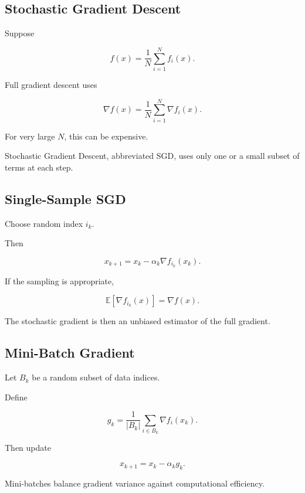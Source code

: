 \subsection{Stochastic Gradient Descent}
\label{subsec:stochastic-gradient-descent}

Suppose

\[
\boxed{
f(x)
=
\frac1N
\sum_{i=1}^{N}
f_i(x).
}
\]

Full gradient descent uses

\[
\boxed{
\nabla f(x)
=
\frac1N
\sum_{i=1}^{N}
\nabla f_i(x).
}
\]

For very large \(N\), this can be expensive.

Stochastic Gradient Descent, abbreviated SGD, uses only one or a small
subset of terms at each step.

\subsection{Single-Sample SGD}
\label{subsec:single-sample-sgd}

Choose random index \(i_k\).

Then

\[
\boxed{
x_{k+1}
=
x_k
-
\alpha_k
\nabla f_{i_k}(x_k).
}
\]

If the sampling is appropriate,

\[
\boxed{
\mathbb{E}
[
\nabla f_{i_k}(x)
]
=
\nabla f(x).
}
\]

The stochastic gradient is then an unbiased estimator of the full
gradient.

\subsection{Mini-Batch Gradient}
\label{subsec:mini-batch-gradient}

Let \(B_k\) be a random subset of data indices.

Define

\[
\boxed{
g_k
=
\frac1{|B_k|}
\sum_{i\in B_k}
\nabla f_i(x_k).
}
\]

Then update

\[
\boxed{
x_{k+1}
=
x_k-\alpha_kg_k.
}
\]

Mini-batches balance gradient variance against computational efficiency.

